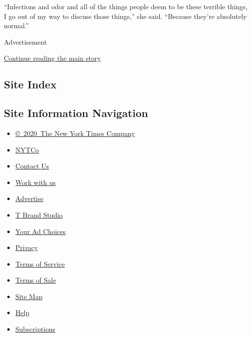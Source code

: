 ``Infections and odor and all of the things people deem to be these
terrible things, I go out of my way to discuss those things,'' she said.
``Because they're absolutely normal.''

Advertisement

\protect\hyperlink{after-bottom}{Continue reading the main story}

\hypertarget{site-index}{%
\subsection{Site Index}\label{site-index}}

\hypertarget{site-information-navigation}{%
\subsection{Site Information
Navigation}\label{site-information-navigation}}

\begin{itemize}
\tightlist
\item
  \href{https://help.nytimes3xbfgragh.onion/hc/en-us/articles/115014792127-Copyright-notice}{©~2020~The
  New York Times Company}
\end{itemize}

\begin{itemize}
\tightlist
\item
  \href{https://www.nytco.com/}{NYTCo}
\item
  \href{https://help.nytimes3xbfgragh.onion/hc/en-us/articles/115015385887-Contact-Us}{Contact
  Us}
\item
  \href{https://www.nytco.com/careers/}{Work with us}
\item
  \href{https://nytmediakit.com/}{Advertise}
\item
  \href{http://www.tbrandstudio.com/}{T Brand Studio}
\item
  \href{https://www.nytimes3xbfgragh.onion/privacy/cookie-policy\#how-do-i-manage-trackers}{Your
  Ad Choices}
\item
  \href{https://www.nytimes3xbfgragh.onion/privacy}{Privacy}
\item
  \href{https://help.nytimes3xbfgragh.onion/hc/en-us/articles/115014893428-Terms-of-service}{Terms
  of Service}
\item
  \href{https://help.nytimes3xbfgragh.onion/hc/en-us/articles/115014893968-Terms-of-sale}{Terms
  of Sale}
\item
  \href{https://spiderbites.nytimes3xbfgragh.onion}{Site Map}
\item
  \href{https://help.nytimes3xbfgragh.onion/hc/en-us}{Help}
\item
  \href{https://www.nytimes3xbfgragh.onion/subscription?campaignId=37WXW}{Subscriptions}
\end{itemize}
